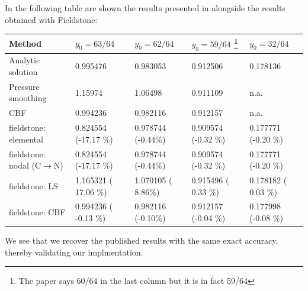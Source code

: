 In the following table are shown the results presented in \cite{zhgh93} alongside the results obtained with Fieldstone:
\begin{center}
\begin{tabular}{l||llll}
\hline
Method             & $y_0=63/64$ & $y_0=62/64$ &  $y_0=59/64$
\footnote{The paper says 60/64 in the last column but it is in fact 59/64}
 & $y_0=32/64$\\ 
\hline
\hline
Analytic solution                   & 0.995476 & 0.983053  &  0.912506 & 0.178136 \\
Pressure smoothing \cite{zhgh93}    & 1.15974  & 1.06498   &  0.911109 & n.a. \\
CBF                \cite{zhgh93}    & 0.994236 & 0.982116  &  0.912157 & n.a. \\
\hline
\hline
fieldstone: elemental               & 0.824554 (-17.17 \%) & 0.978744 (-0.44\%) & 0.909574 (-0.32 \%) & 0.177771 (-0.20 \%)\\
fieldstone: nodal (C$\rightarrow$N) & 0.824554 (-17.17 \%) & 0.978744 (-0.44\%) & 0.909574 (-0.32 \%) & 0.177771 (-0.20 \%)\\
fieldstone: LS                      & 1.165321 ( 17.06 \%) & 1.070105 ( 8.86\%) & 0.915496 ( 0.33 \%) & 0.178182 ( 0.03 \%)\\
fieldstone: CBF                     & 0.994236 ( -0.13 \%) & 0.982116 (-0.10\%) & 0.912157 (-0.04 \%) & 0.177998 (-0.08 \%)\\
\hline
\end{tabular}
\end{center}
We see that we recover the published results with the same exact accuracy, thereby validating our implmentation.

